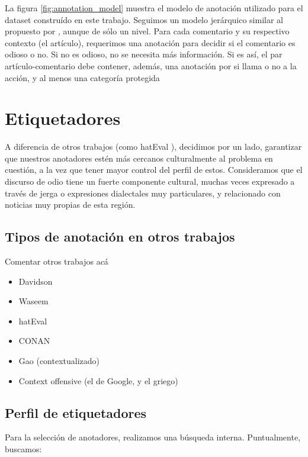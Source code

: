 La figura \ref{fig:annotation_model} muestra el modelo de anotación utilizado para el dataset construído en este trabajo. Seguimos un modelo jerárquico similar al propuesto por \citet{zampieri2019predicting}, aunque de sólo un nivel. Para cada comentario y su respectivo contexto (el artículo), requerimos una anotación  para decidir si el comentario es odioso o no. Si no es odioso, no se necesita más información. Si es así, el par artículo-comentario debe contener, además, una anotación por si llama o no a la acción, y al menos una categoría protegida





\section{Etiquetadores}

A diferencia de otros trabajos (como hatEval \cite{hateval2019semeval}), decidimos por un lado, garantizar que nuestros anotadores estén más cercanos culturalmente al problema en cuestión, a la vez que tener mayor control del perfil de estos. Consideramos que el discurso de odio tiene un fuerte componente cultural, muchas veces expresado a través de jerga o expresiones dialectales muy particulares, y relacionado con noticias muy propias de esta región.


\subsection{Tipos de anotación en otros trabajos}

Comentar otros trabajos acá

\begin{itemize}
    \item Davidson
    \item Waseem
    \item hatEval
    \item CONAN
    \item Gao (contextualizado)
    \item Context offensive (el de Google, y el griego)
\end{itemize}

\subsection{Perfil de etiquetadores}

Para la selección de anotadores, realizamos una búsqueda interna. Puntualmente, buscamos:

